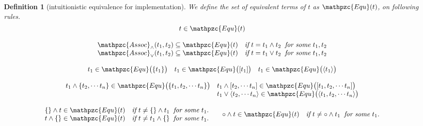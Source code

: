 \documentclass[12pt]{article}
\newtheorem{Definition}{Definition}[section]
\begin{document}
\pagebreak
\begin{Definition}[intuitionistic equivalence for implementation]
  \label{equality_for_implementation}
  We define the set of equivalent terms of $t$ as $\mathpzc{Equ}(t)$,
  on following rules.
  \begin{displaymath}
    \begin{array}{c}
      
      t \in \mathpzc{Equ}(t)  \\
      \\

      \mathpzc{Assoc}_\wedge(t_1, t_2) \subseteq
       \mathpzc{Equ}(t) \quad \text{\it if}\ t = t_1 \wedge t_2\;\;
        \text{\it for some}\ t_1, t_2 \\
      
      \mathpzc{Assoc}_\vee(t_1, t_2) \subseteq
       \mathpzc{Equ}(t) \quad \text{\it if}\  t = t_1 \vee t_2\;\;
        \text{\it for some}\ t_1, t_2  \\
      \\

      \begin{array}{lll}
        t_1 \in \mathpzc{Equ}\bigl(\{t_1\} \bigr)
        & t_1 \in \mathpzc{Equ}\bigl([t_1] \bigr)
        & t_1 \in \mathpzc{Equ}\bigl(\langle t_1 \rangle \bigr)
      \end{array}  \\
      \\

      \begin{array}{ll}
        t_1 \wedge \{t_2, \cdots t_n\} \in
        \mathpzc{Equ}\bigl(\{t_1, t_2, \cdots t_n\} \bigr)
        & t_1 \wedge [t_2, \cdots t_n] \in
        \mathpzc{Equ}\bigl([t_1, t_2, \cdots t_n] \bigr)  \\
        & t_1 \vee \langle t_2, \cdots t_n \rangle \in
        \mathpzc{Equ}\bigl(\langle t_1, t_2, \cdots t_n \rangle \bigr)
      \end{array}  \\
      \\
      
      \begin{array}{ll}
        \begin{array}{l}
          \{\} \wedge t \in \mathpzc{Equ}(t)\quad \text{\it if}\ t \neq \{\}
           \wedge t_1\;\; \text{\it for some}\ t_1.  \\
          
          t \wedge \{\} \in \mathpzc{Equ}(t)\quad \text{\it if}\ t \neq t_1
           \wedge \{\}\;\; \text{\it for some}\ t_1.  \\
        \end{array}
        & \begin{array}{l}
            \circ \wedge t \in \mathpzc{Equ}(t)\quad \text{\it if}\
             t \neq \circ \wedge t_1\;\; \text{\it for some}\ t_1.  \\
             

\end{array}
\end{array}
\end{array}
\end{displaymath}
\end{Definition}
\end{document}
